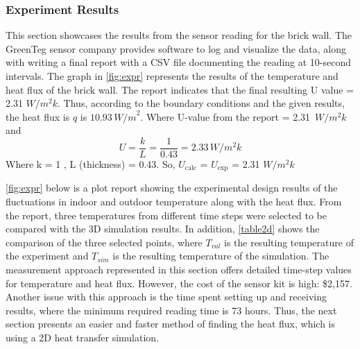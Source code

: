 \subsubsection{Experiment Results}
This section showcases the results from the sensor reading for the brick wall. The GreenTeg sensor company provides software to log and visualize the data, along with writing a final report with a CSV file documenting the reading at 10-second intervals. The graph in \ref{fig:expr} represents the results of the temperature and heat flux of the brick wall. 
The report indicates that the final resulting U value = 2.31 ${W/m^2k}$. Thus, according to the boundary conditions and the given results, the heat flux is \( q \) is \( 10.93\, {W/m}^2 \). 
Where U-value from the report = 2.31\, ${W/m^2k}$ and 
\begin{equation}
    U = \frac{k}{L}
      = \frac{1}{0.43} = 2.33\,  {W/m^2k}
\end{equation}
Where k = 1 , L (thickness) = 0.43. So, \(U_{\text{calc}}\) = \(U_{\text{exp}}\) = 2.31 ${W/m^2k}$ 

\ref{fig:expr} below is a plot report showing the experimental design results of the fluctuations in indoor and outdoor temperature along with the heat flux. From the report, three temperatures from different time steps were selected to be compared with the 3D simulation results. In addition, \ref{table2d} shows the comparison of the three selected points, where $T_{val}$ is the resulting temperature of the experiment and $T_{sim}$ is the resulting temperature of the simulation. 
The measurement approach represented in this section offers detailed time-step values for temperature and heat flux. However, the cost of the sensor kit is high: \$2,157. Another issue with this approach is the time spent setting up and receiving results, where the minimum required reading time is 73 hours. Thus, the next section presents an easier and faster method of finding the heat flux, which is using a 2D heat transfer simulation.




